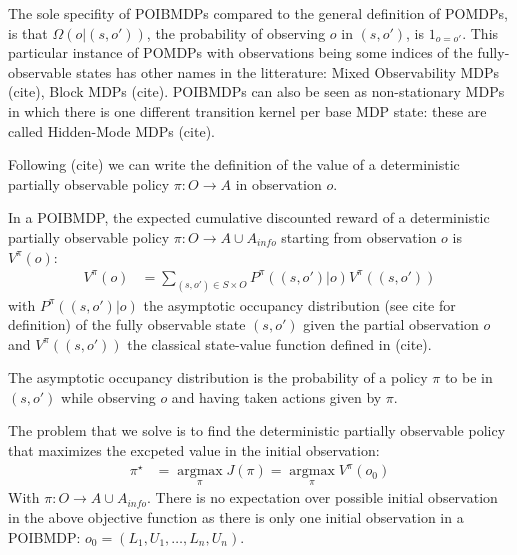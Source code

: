 The sole specifity of POIBMDPs compared to the general definition of POMDPs, is that $\Omega(o|(s, o'))$, the probability of observing $o$ in $(s,o')$, is $1_{o=o'}$.
This particular instance of POMDPs with observations being some indices of the fully-observable states has other names in the litterature: Mixed Observability MDPs (cite), Block MDPs (cite).
POIBMDPs can also be seen as non-stationary MDPs in which there is one different transition kernel per base MDP state: these are called Hidden-Mode MDPs (cite). 

Following (cite) we can write the definition of the value of a deterministic partially observable policy $\pi:O\rightarrow A$ in observation $o$.

\begin{definition} In a POIBMDP, the expected cumulative discounted reward of a deterministic partially observable policy $\pi:O\rightarrow A\cup A_{info}$ starting from observation $o$ is $V^{\pi}(o)$:
    \begin{align*}
        V^{\pi}(o) &= \underset{(s,o')\in S\times O}{\sum}P^{\pi}((s, o')|o)V^{\pi}((s, o'))
    \end{align*}
with $P^{\pi}((s, o')|o)$ the asymptotic occupancy distribution (see cite for definition) of the fully observable state $(s,o')$ given the partial observation $o$ and $V^{\pi}((s, o'))$ the classical state-value function defined in (cite).
\end{definition}


The asymptotic occupancy distribution is the probability of a policy $\pi$ to be in $(s,o')$ while observing $o$ and having taken actions given by $\pi$.  

The problem that we solve is to find the deterministic partially observable policy that maximizes the excpeted value in the initial observation:
\begin{align}
    \pi^{\star} &= \underset{\pi}{\operatorname{argmax}}J(\pi) = \underset{\pi}{\operatorname{argmax}}V^{\pi}(o_0)
\end{align}
With $\pi:O\rightarrow A\cup A_{info}$. There is no expectation over possible initial observation in the above objective function as there is only one initial observation in a POIBMDP: $o_0=(L_1, U_1, \dots, L_n, U_n)$.

